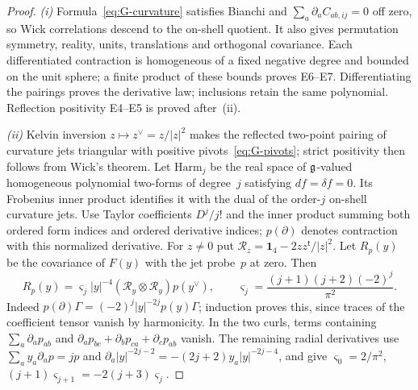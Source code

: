 \begin{proof}
\emph{(i)} Formula~\eqref{eq:G-curvature} satisfies Bianchi and $\sum_a\partial_a C_{ab,ij}=0$ off zero, so Wick correlations descend to the on-shell quotient. It also gives permutation symmetry, reality, units, translations and orthogonal covariance. Each differentiated contraction is homogeneous of a fixed negative degree and bounded on the unit sphere; a finite product of these bounds proves E6--E7. Differentiating the pairings proves the derivative law; inclusions retain the same polynomial. Reflection positivity E4--E5 is proved after~(ii).

\emph{(ii)} Kelvin inversion $z\mapsto z^\vee=z/|z|^2$ makes the reflected two-point pairing of curvature jets triangular with positive pivots~\eqref{eq:G-pivots}; strict positivity then follows from Wick's theorem. Let $\mathrm{Harm}_j$ be the real space of $\mathfrak{g}$-valued homogeneous polynomial two-forms of degree~$j$ satisfying $df=\delta f=0$. Its Frobenius inner product identifies it with the dual of the order-$j$ on-shell curvature jets. Use Taylor coefficients $D^j/j!$ and the inner product summing both ordered form indices and ordered derivative indices; $p(\partial)$ denotes contraction with this normalized derivative. For $z\ne0$ put $\mathcal R_z=\mathbf 1_4-2zz^{\mathsf t}/|z|^2$. Let $R_p(y)$ be the covariance of $F(y)$ with the jet probe~$p$ at zero. Then
\begin{equation}\label{eq:G-kelvin}
R_p(y)=\varsigma_j|y|^{-4}(\mathcal R_y\otimes\mathcal R_y)p(y^\vee),
\qquad \varsigma_j=\frac{(j+1)(j+2)(-2)^j}{\pi^2}.
\end{equation}
Indeed $p(\partial)\Gamma=(-2)^j|y|^{-2j}p(y)\Gamma$; induction proves this, since traces of the coefficient tensor vanish by harmonicity. In the two curls, terms containing $\sum_a\partial_ap_{ab}$ and $\partial_ap_{bc}+\partial_bp_{ca}+\partial_cp_{ab}$ vanish. The remaining radial derivatives use $\sum_a y_a\partial_ap=jp$ and $\partial_a|y|^{-2j-2}=-(2j+2)y_a|y|^{-2j-4}$, and give $\varsigma_0=2/\pi^2$, $(j+1)\varsigma_{j+1}=-2(j+3)\varsigma_j$.


\end{proof}
